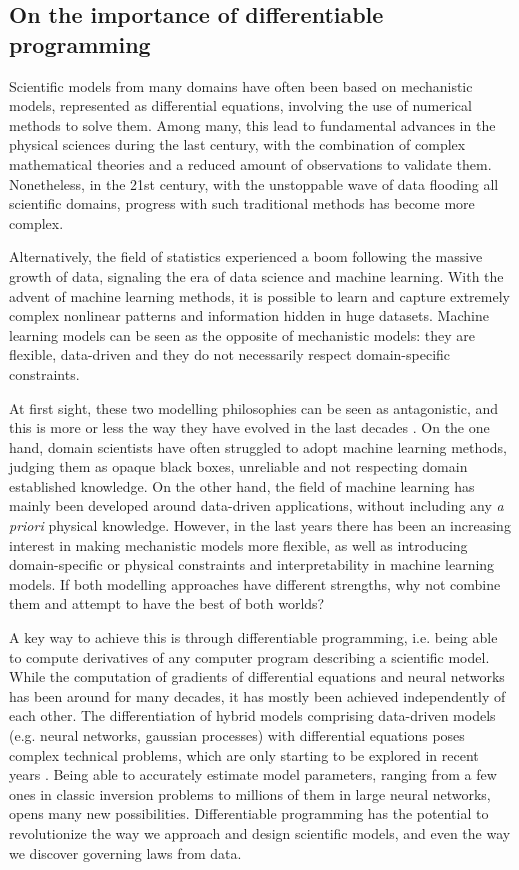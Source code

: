 \subsection{On the importance of differentiable programming}

Scientific models from many domains have often been based on mechanistic models, represented as differential equations, involving the use of numerical methods to solve them. 
Among many, this lead to fundamental advances in the physical sciences during the last century, with the combination of complex mathematical theories and a reduced amount of observations to validate them. 
Nonetheless, in the 21st century, with the unstoppable wave of data flooding all scientific domains, progress with such traditional methods has become more complex. 

Alternatively, the field of statistics experienced a boom following the massive growth of data, signaling the era of data science and machine learning.
With the advent of machine learning methods, it is possible to learn and capture extremely complex nonlinear patterns and information hidden in huge datasets. 
Machine learning models can be seen as the opposite of mechanistic models: they are flexible, data-driven and they do not necessarily respect domain-specific constraints.

At first sight, these two modelling philosophies can be seen as antagonistic, and this is more or less the way they have evolved in the last decades \cite{zdeborova_understanding_2020}. 
On the one hand, domain scientists have often struggled to adopt machine learning methods, judging them as opaque black boxes, unreliable and not respecting domain established knowledge. 
On the other hand, the field of machine learning has mainly been developed around data-driven applications, without including any \textit{a priori} physical knowledge. 
However, in the last years there has been an increasing interest in making mechanistic models more flexible, as well as introducing domain-specific or physical constraints and interpretability in machine learning models. 
If both modelling approaches have different strengths, why not combine them and attempt to have the best of both worlds?

A key way to achieve this is through differentiable programming, i.e. being able to compute derivatives of any computer program describing a scientific model.
While the computation of gradients of differential equations and neural networks has been around for many decades, it has mostly been achieved independently of each other. 
The differentiation of hybrid models comprising data-driven models (e.g. neural networks, gaussian processes) with differential equations poses complex technical problems, which are only starting to be explored in recent years \cite{ma_comparison_2021}. 
Being able to accurately estimate model parameters, ranging from a few ones in classic inversion problems to millions of them in large neural networks, opens many new possibilities. 
Differentiable programming has the potential to revolutionize the way we approach and design scientific models, and even the way we discover governing laws from data. 

